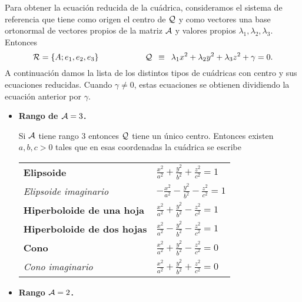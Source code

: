 \documentclass[11pt, a4paper, titlepage]{article}
\theoremstyle{theorem-style}
\theoremstyle{definition-style}
\theoremstyle{remark-style}
\theoremstyle{example-style}
\begin{document}
Para obtener la ecuaci\'on reducida de la cu\'adrica, consideramos el sistema de referencia que tiene como origen el centro de $\cal Q$ y como vectores una base ortonormal de vectores propios de la matriz $\cal A$ y valores propios $\lambda_1,\lambda_2,\lambda_3$. Entonces
\[
{\cal R} =\{A; {e}_1, {e}_2, {e}_3 \}
\hspace{2cm}
{\cal Q} \, \, \, \equiv \, \, \, \lambda_1 {x}^2 +\lambda_2 {y}^2 +\lambda_3 {z}^2 +
{\gamma} = 0.
\]
A continuaci\'on damos la lista de los distintos tipos de cu\'adricas con centro y  sus ecuaciones reducidas. Cuando ${\gamma}\neq 0$, estas ecuaciones se obtienen dividiendo la ecuaci\'on anterior por ${\gamma}$. 

\begin{itemize}
	
\item
{ {\bf Rango de ${\cal A} = 3$.}} 

\vspace{.3cm}

Si $\cal A$ tiene rango $3$ entonces $\cal Q$ tiene un \'unico centro.
Entonces existen $a,b,c>0$ tales que en esas coordenadas la cu\'adrica se escribe 


\begin{tabular}{ll}
{\bf  Elipsoide} \hspace{5cm} & 
$
\frac{{x}^2}{a^2} + \frac{{y}^2}{b^2}+\frac{{z}^2}{c^2} = 1
$
\vspace{.5cm}
\\
{\it Elipsoide imaginario}  &
$
-\frac{{x}^2}{a^2} - \frac{{y}^2}{b^2} - \frac{{z}^2}{c^2} = 1
$
\vspace{.5cm}
\\
{\bf  Hiperboloide de una hoja}  &
$
\frac{{x}^2}{a^2} + \frac{{y}^2}{b^2}-\frac{{z}^2}{c^2} = 1
$
\vspace{.5cm}
\\
{\bf  Hiperboloide de dos hojas} &
$
\frac{{x}^2}{a^2} - \frac{{y}^2}{b^2}-\frac{{z}^2}{c^2} = 1
$
\vspace{.5cm}
\\
{\bf  Cono}  &
$
\frac{{x}^2}{a^2} + \frac{{y}^2}{b^2}-\frac{{z}^2}{c^2} = 0
$
\vspace{.5cm}
\\
{\it Cono imaginario}  &
$
\frac{{x}^2}{a^2} + \frac{{y}^2}{b^2}+\frac{{z}^2}{c^2}=0
$
\vspace{.4cm}
\end{tabular}



\item {\bf Rango ${\cal A}=2$.} 



\end{itemize}
\end{document}
